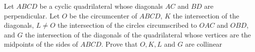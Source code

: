 Let $ABCD$ be a cyclic quadrilateral whose diagonals $AC$ and $BD$ are perpendicular. Let $O$ be the circumcenter of $ABCD$,  $K$ the intersection of the diagonals,  $ L\neq O $ the intersection of the circles circumscribed to $OAC$ and $OBD$,  and $G$ the intersection of the diagonals of the quadrilateral whose vertices are the midpoints of the sides of $ABCD$. Prove that $O, K, L$ and $G$ are collinear